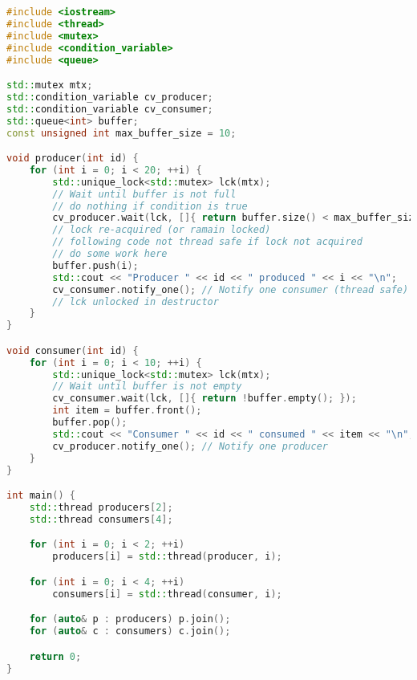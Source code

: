 \begin{lstlisting}[language=cpp]
#include <iostream>
#include <thread>
#include <mutex>
#include <condition_variable>
#include <queue>

std::mutex mtx;
std::condition_variable cv_producer;
std::condition_variable cv_consumer;
std::queue<int> buffer;
const unsigned int max_buffer_size = 10;

void producer(int id) {
    for (int i = 0; i < 20; ++i) {
        std::unique_lock<std::mutex> lck(mtx);
        // Wait until buffer is not full
        // do nothing if condition is true
        cv_producer.wait(lck, []{ return buffer.size() < max_buffer_size; });
        // lock re-acquired (or ramain locked)
        // following code not thread safe if lock not acquired
        // do some work here
        buffer.push(i);
        std::cout << "Producer " << id << " produced " << i << "\n";
        cv_consumer.notify_one(); // Notify one consumer (thread safe)
        // lck unlocked in destructor
    }
}

void consumer(int id) {
    for (int i = 0; i < 10; ++i) {
        std::unique_lock<std::mutex> lck(mtx);
        // Wait until buffer is not empty
        cv_consumer.wait(lck, []{ return !buffer.empty(); });
        int item = buffer.front();
        buffer.pop();
        std::cout << "Consumer " << id << " consumed " << item << "\n";
        cv_producer.notify_one(); // Notify one producer
    }
}

int main() {
    std::thread producers[2];
    std::thread consumers[4];

    for (int i = 0; i < 2; ++i)
        producers[i] = std::thread(producer, i);

    for (int i = 0; i < 4; ++i)
        consumers[i] = std::thread(consumer, i);

    for (auto& p : producers) p.join();
    for (auto& c : consumers) c.join();

    return 0;
}
\end{lstlisting}

